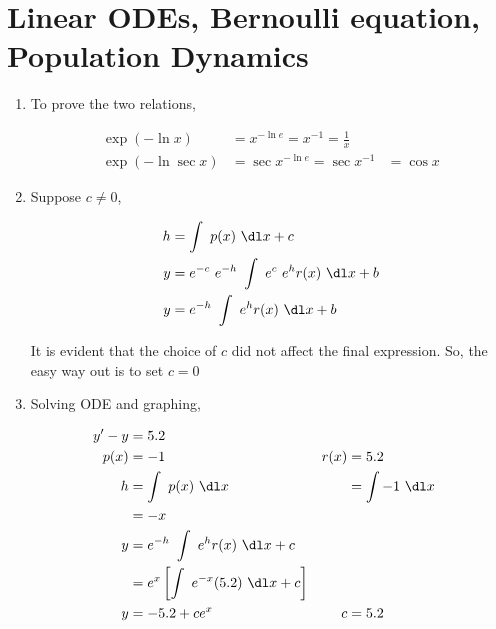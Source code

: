 \section{Linear ODEs, Bernoulli equation, Population Dynamics}

\begin{enumerate}
    \item To prove the two relations,

          \begin{align}
              \exp(-\ln x)      & = x^{-\ln e} = x^{-1} = \frac{1}{x}            \\
              \exp(-\ln \sec x) & = \sec x ^{-\ln e} = \sec x ^{-1}   & = \cos x
          \end{align}


    \item Suppose $ c \neq 0 $,

          \begin{align}
              h & = \int\ p(x)\ \dl x + c                             \\
              y & = e^{-c}\ e^{-h}\ \int\ e^{c}\ e^{h}r(x)\ \dl x + b \\
              y & = e^{-h}\ \int\ e^{h}r(x)\ \dl x + b
          \end{align}

          It is evident that the choice of $ c $ did not affect the final expression.
          So, the easy way out is to set $ c = 0 $

    \item Solving ODE and graphing,

          \begin{align}
              y'  - y & = 5.2                                                  \\
              p(x)    & = -1                                                 &
              r(x)    & = 5.2                                                  \\
              h       & = \int\ p(x)\ \dl x                                  &
                      & = \int -1\ \dl x                                       \\
                      & = -x                                                   \\
              y       & = e^{-h}\ \int\ e^{h}r(x)\ \dl x + c                   \\
                      & = e^{x} \left[ \int\ e^{-x} (5.2)\ \dl x + c \right]   \\
              y       & = -5.2 + ce^{x}                                      &
              c       & = 5.2
          \end{align}


\end{enumerate}
